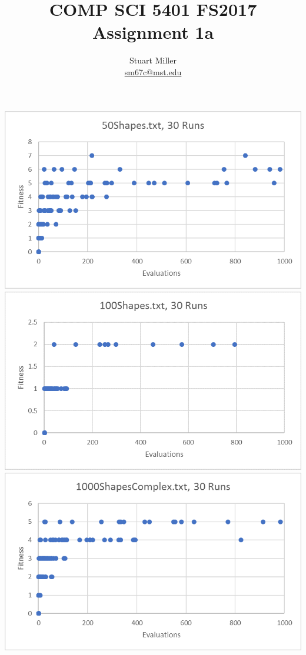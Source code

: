 \documentclass[11pt]{article}
\begin{document}
	\title{COMP SCI 5401 FS2017 Assignment 1a}
	\author{Stuart Miller\\\href{mailto:sm67c@mst.edu}{sm67c@mst.edu}}
	\maketitle
	
	\centering
	\includegraphics{instance1.png}
	\includegraphics{instance2.png}
	\includegraphics{instance3.png}
	
\end{document}
